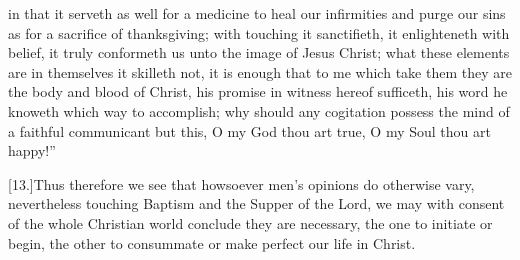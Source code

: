  in that it serveth as well for a medicine to heal our infirmities and purge our sins as for a sacrifice of thanksgiving; with touching it sanctifieth, it enlighteneth with belief, it truly conformeth us unto the image of Jesus Christ; what these elements are in themselves it skilleth not, it is enough that to me which take them they are the body and blood of Christ, his promise in witness hereof sufficeth, his word he knoweth which way to accomplish; why should any cogitation possess the mind of a faithful communicant but this, O my God thou art true, O my Soul thou art happy!”

[13.]Thus therefore we see that howsoever men’s opinions do otherwise vary, nevertheless touching Baptism and the Supper of the Lord, we may with consent of the whole Christian world conclude they are necessary, the one to initiate or begin, the other to consummate or make perfect our life in Christ.


